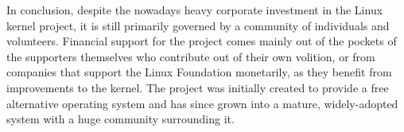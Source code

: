 In conclusion, despite the nowadays heavy corporate investment in the Linux kernel project, it is still primarily governed by a community of individuals and volunteers. Financial support for the project comes mainly out of the pockets of the supporters themselves who contribute out of their own volition, or from companies that support the Linux Foundation monetarily, as they benefit from improvements to the kernel. The project was initially created to provide a free alternative operating system and has since grown into a mature, widely-adopted system with a huge community surrounding it.

